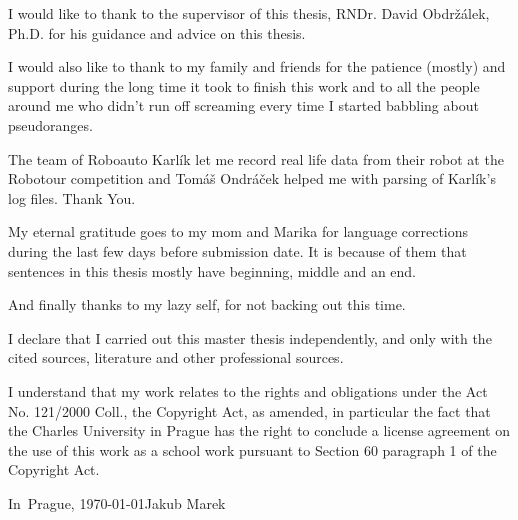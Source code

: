 

\noindent
I would like to thank to the supervisor of this thesis,
RNDr. David Obdržálek, Ph.D. for his guidance and advice on this thesis.

I would also like to thank to my family and friends for the patience (mostly) and
support during the long time it took to finish this work and to all the people
around me who didn't run off screaming every time I started babbling about pseudoranges.

The team of Roboauto Karlík let me record real life data from their robot at the
Robotour competition and Tomáš Ondráček helped me with parsing of Karlík's log files.
Thank You.

My eternal gratitude goes to my mom and Marika for language
corrections during the last few days before submission date.
It is because of them that sentences in this thesis mostly have beginning,
middle and an end.

And finally thanks to my lazy self, for not backing out this time.

\cleartorecto

\vspace*{\fill}
\noindent
I declare that I carried out this master thesis independently, and only with the cited
sources, literature and other professional sources.

I understand that my work relates to the rights and obligations under the Act No.
121/2000 Coll., the Copyright Act, as amended, in particular the fact that the Charles
University in Prague has the right to conclude a license agreement on the use of this
work as a school work pursuant to Section 60 paragraph 1 of the Copyright Act.

\vspace{10mm}
\noindent In~Prague, \today\hspace{\fill}Jakub Marek\\
\vspace{10mm}
\cleartorecto

\tableofcontents*
\cleartorecto

